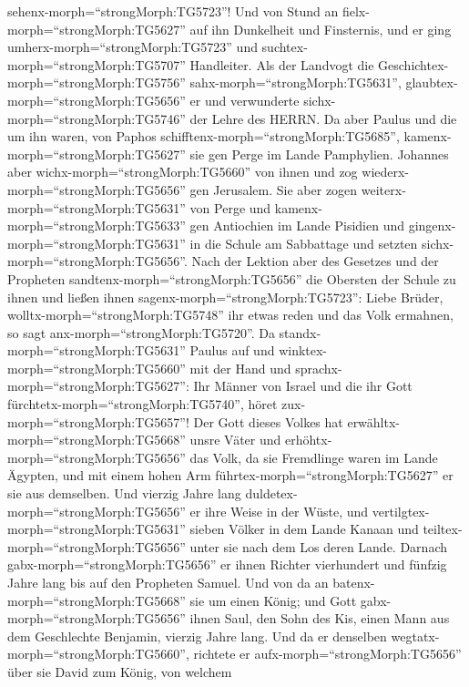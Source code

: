 sehenx-morph=``strongMorph:TG5723''! Und von Stund an
fielx-morph=``strongMorph:TG5627'' auf ihn Dunkelheit und Finsternis,
und er ging umherx-morph=``strongMorph:TG5723'' und
suchtex-morph=``strongMorph:TG5707'' Handleiter.  Als der
Landvogt die Geschichtex-morph=``strongMorph:TG5756''
sahx-morph=``strongMorph:TG5631'', glaubtex-morph=``strongMorph:TG5656''
er und verwunderte sichx-morph=``strongMorph:TG5746'' der Lehre des
HERRN.  Da aber Paulus und die um ihn waren, von Paphos
schifftenx-morph=``strongMorph:TG5685'',
kamenx-morph=``strongMorph:TG5627'' sie gen Perge im Lande Pamphylien.
Johannes aber wichx-morph=``strongMorph:TG5660'' von ihnen und zog
wiederx-morph=``strongMorph:TG5656'' gen Jerusalem.  Sie
aber zogen weiterx-morph=``strongMorph:TG5631'' von Perge und
kamenx-morph=``strongMorph:TG5633'' gen Antiochien im Lande Pisidien und
gingenx-morph=``strongMorph:TG5631'' in die Schule am Sabbattage und
setzten sichx-morph=``strongMorph:TG5656''.  Nach der
Lektion aber des Gesetzes und der Propheten
sandtenx-morph=``strongMorph:TG5656'' die Obersten der Schule zu ihnen
und ließen ihnen sagenx-morph=``strongMorph:TG5723'': Liebe Brüder,
wolltx-morph=``strongMorph:TG5748'' ihr etwas reden und das Volk
ermahnen, so sagt anx-morph=``strongMorph:TG5720''.  Da
standx-morph=``strongMorph:TG5631'' Paulus auf und
winktex-morph=``strongMorph:TG5660'' mit der Hand und
sprachx-morph=``strongMorph:TG5627'': Ihr Männer von Israel und die ihr
Gott fürchtetx-morph=``strongMorph:TG5740'', höret
zux-morph=``strongMorph:TG5657''!  Der Gott dieses Volkes
hat erwähltx-morph=``strongMorph:TG5668'' unsre Väter und
erhöhtx-morph=``strongMorph:TG5656'' das Volk, da sie Fremdlinge waren
im Lande Ägypten, und mit einem hohen Arm
führtex-morph=``strongMorph:TG5627'' er sie aus demselben. 
Und vierzig Jahre lang duldetex-morph=``strongMorph:TG5656'' er ihre
Weise in der Wüste,  und
vertilgtex-morph=``strongMorph:TG5631'' sieben Völker in dem Lande
Kanaan und teiltex-morph=``strongMorph:TG5656'' unter sie nach dem Los
deren Lande.  Darnach gabx-morph=``strongMorph:TG5656'' er
ihnen Richter vierhundert und fünfzig Jahre lang bis auf den Propheten
Samuel.  Und von da an batenx-morph=``strongMorph:TG5668''
sie um einen König; und Gott gabx-morph=``strongMorph:TG5656'' ihnen
Saul, den Sohn des Kis, einen Mann aus dem Geschlechte Benjamin, vierzig
Jahre lang.  Und da er denselben
wegtatx-morph=``strongMorph:TG5660'', richtete er
aufx-morph=``strongMorph:TG5656'' über sie David zum König, von welchem
